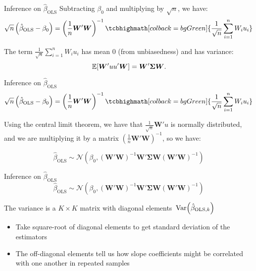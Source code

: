 \documentclass[aspectratio=169,t,11pt,table]{beamer}
\begin{document}
\begin{frame}{Inference on $\hat{\beta}_{\text{OLS}}$}
  Subtracting $\beta_0$ and multiplying by $\sqrt{n}$, we have:
  $$
    \sqrt{n} \left( \hat{\beta}_{\text{OLS}} - \beta_0 \right) = 
    \left( \frac{1}{n} \bm{W}' \bm{W} \right)^{-1} \tcbhighmath[colback = bgGreen]{ \frac{1}{\sqrt{n}} \sum_{i=1}^n W_i u_i }
  $$
  


  \bigskip\bigskip
  The term $\frac{1}{\sqrt{n}} \sum_{i=1}^n W_i u_i$ has mean 0 (from unbiasedness) and has variance:
  $$
    \expec{\bm{W}' u u' \bm{W}} = \bm{W}' \bm{\Sigma} \bm{W}.
  $$
\end{frame}

\begin{frame}{Inference on $\hat{\beta}_{\text{OLS}}$}
  \vspace*{-\bigskipamount}
  $$
    \sqrt{n} \left( \hat{\beta}_{\text{OLS}} - \beta_0 \right) = 
    \left( \frac{1}{n} \bm{W}' \bm{W} \right)^{-1} \tcbhighmath[colback = bgGreen]{ \frac{1}{\sqrt{n}} \sum_{i=1}^n W_i u_i }
  $$

  \bigskip
  Using the central limit theorem, we have that $\frac{1}{\sqrt{n}} \bm{W}' u$ is normally distributed, and we are multiplying it by a matrix $\left( \frac{1}{n} \bm{W}' \bm{W} \right)^{-1}$, so we have: 

  $$
    \hat{\beta}_{\text{OLS}} \sim 
    \mathcal{N}\left( \beta_0, \left(\bm{W}' \bm{W} \right)^{-1} \bm{W}' \bm{\Sigma} \bm{W} \left(\bm{W}' \bm{W} \right)^{-1} \right)
  $$

\end{frame}

\begin{frame}{Inference on $\hat{\beta}_{\text{OLS}}$}
  \vspace*{-\bigskipamount}
  $$
    \hat{\beta}_{\text{OLS}} \sim 
    \mathcal{N}\left( \beta_0, \left(\bm{W}' \bm{W} \right)^{-1} \bm{W}' \bm{\Sigma} \bm{W} \left(\bm{W}' \bm{W} \right)^{-1} \right)
  $$

  \bigskip
  The variance is a $K \times K$ matrix with diagonal elements $\var{\hat{\beta}_{\text{OLS}, k}}$
  \begin{itemize}
    \item Take square-root of diagonal elements to get standard deviation of the estimators

    \pause
    \item The off-diagonal elements tell us how slope coefficients might be correlated with one another in repeated samples
  \end{itemize}
\end{frame}
\end{document}
